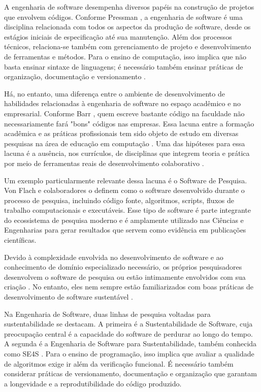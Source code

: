 \documentclass[english, spanish, brazilian]{RBIEarticle}
\begin{document}
	A engenharia de software desempenha diversos papéis na construção de projetos que envolvem códigos. Conforme Pressman \cite{pressman2016}, a engenharia de software é uma disciplina relacionada com todos os aspectos da produção de software, desde os estágios iniciais de especificação até sua manutenção. Além dos processos técnicos, relaciona-se também com gerenciamento de projeto e desenvolvimento de ferramentas e métodos. Para o ensino de computação, isso implica que não basta ensinar sintaxe de linguagens; é necessário também ensinar práticas de organização, documentação e versionamento \cite{sommerville2011}.
	
	Há, no entanto, uma diferença entre o ambiente de desenvolvimento de habilidades relacionadas à engenharia de software no espaço acadêmico e no empresarial. Conforme Barr \cite{barr2018}, quem escreve bastante código na faculdade não necessariamente fará "bons" códigos nas empresas. Essa lacuna entre a formação acadêmica e as práticas profissionais tem sido objeto de estudo em diversas pesquisas na área de educação em computação \cite{qian2017}. Uma das hipóteses para essa lacuna é a ausência, nos currículos, de disciplinas que integrem teoria e prática por meio de ferramentas reais de desenvolvimento colaborativo \cite{arcuri2020}.
	
	Um exemplo particularmente relevante dessa lacuna é o Software de Pesquisa. Von Flach e colaboradores \cite{vonflach2023} o definem como o software desenvolvido durante o processo de pesquisa, incluindo código fonte, algoritmos, scripts, fluxos de trabalho computacionais e executáveis. Esse tipo de software é parte integrante do ecossistema de pesquisa moderno e é amplamente utilizado nas Ciências e Engenharias para gerar resultados que servem como evidência em publicações científicas.
	
	Devido à complexidade envolvida no desenvolvimento de software e ao conhecimento de domínio especializado necessário, os próprios pesquisadores desenvolvem o software de pesquisa ou estão intimamente envolvidos com sua criação \cite{carver2007}. No entanto, eles nem sempre estão familiarizados com boas práticas de desenvolvimento de software sustentável \cite{vonflach2023}.
	
	Na Engenharia de Software, duas linhas de pesquisa voltadas para sustentabilidade se destacam. A primeira é a Sustentabilidade de Software, cuja preocupação central é a capacidade do software de perdurar ao longo do tempo. A segunda é a Engenharia de Software para Sustentabilidade, também conhecida como SE4S \cite{venters2021}. Para o ensino de programação, isso implica que avaliar a qualidade de algoritmos exige ir além da verificação funcional. É necessário também considerar práticas de versionamento, documentação e organização que garantam a longevidade e a reprodutibilidade do código produzido.
	
\end{document}
